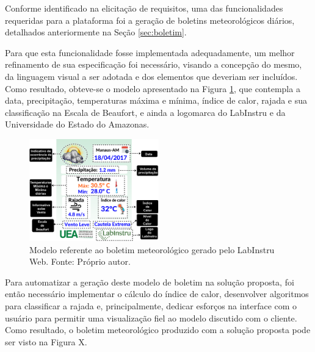 Conforme identificado na elicitação de requisitos, uma das funcionalidades requeridas para a plataforma foi a geração de boletins meteorológicos diários, detalhados anteriormente na Seção \ref{sec:boletim}.

Para que esta funcionalidade fosse implementada adequadamente, um melhor refinamento de sua especificação foi necessário, visando a concepção do mesmo, da linguagem visual a ser adotada e dos elementos que deveriam ser incluídos. Como resultado, obteve-se o modelo apresentado na Figura \ref{fig:modeloBoletim}, que contempla a data, precipitação, temperaturas máxima e mínima, índice de calor, rajada e sua classificação na Escala de Beaufort, e ainda a logomarca do LabInstru e da Universidade do Estado do Amazonas.

\begin{figure}[h!]
	\centering
	\includegraphics[width=0.5\textwidth]{./img/esbocoBoletim.png}
	\caption{Modelo referente ao boletim meteorológico gerado pelo LabInstru Web. Fonte: Próprio autor.} \label{fig:modeloBoletim}
\end{figure}

Para automatizar a geração deste modelo de boletim na solução proposta, foi então necessário implementar o cálculo do índice de calor, desenvolver algoritmos para classificar a rajada e, principalmente, dedicar esforços na interface com o usuário para permitir uma visualização fiel ao modelo discutido com o cliente. Como resultado, o boletim meteorológico produzido com a solução proposta pode ser visto na Figura X.


